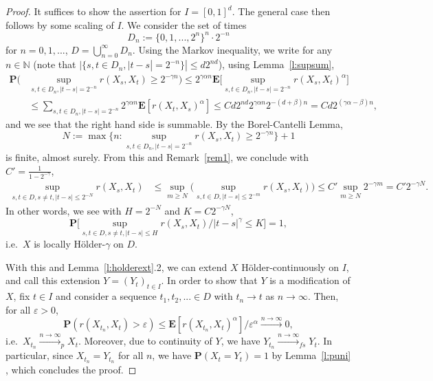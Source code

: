 \documentclass{article}
\theoremstyle{definition}
\theoremstyle{step} \newtheorem{step}{Step}
\begin{document}
\begin{proof}
  It suffices to show the assertion for $I=[0,1]^d$. The general case
  then follows by some scaling of $I$. We consider the set of times
  $$ D_n := \{0,1,...,2^n\}^n \cdot 2^{-n}$$ for $n=0,1,...$, $D
  =\bigcup_{n=0}^\infty D_n$. Using the Markov inequality, we write
  for any $n\in\mathbb N$ (note that $|\{s,t\in D_n, |t-s| = 2^{-n}\}|
  \leq d2^{nd}$), using Lemma~\ref{l:supsum},
  \begin{align*}
    \mathbf P\Big( & \sup_{s,t\in D_n, |t-s| = 2^{-n}} r(X_s, X_t)
    \geq 2^{-\gamma n} \Big) \leq 2^{\gamma \alpha n}\mathbf
    E\Big[\sup_{s,t\in D_n, |t-s| = 2^{-n}} r(X_s, X_t)^\alpha \Big]
    \\ & \leq \sum_{s,t\in D_n, |t-s| = 2^{-n}} 2^{\gamma\alpha
      n}\mathbf E[r(X_t,X_s)^\alpha] \leq Cd2^{nd} 2^{\gamma\alpha n}
    2^{-(d + \beta) n} = Cd 2^{(\gamma\alpha - \beta)n},
  \end{align*}
  and we see that the right hand side is summable. By the
  Borel-Cantelli Lemma,
  $$ N := \max \Big\{n: \sup_{s,t\in D_n, |t-s| = 2^{-n}} r(X_s, X_t)
  \geq 2^{-\gamma n}\Big\} + 1$$ is finite, almost surely. From this
  and Remark~\ref{rem1}, we conclude with $C' =
  \frac{1}{1-2^{-\gamma}}$,
  \begin{align*}
    \sup_{s,t\in D, s\neq t, |t-s| \leq 2^{-N}} r(X_s, X_t) & \leq
    \sup_{m \geq N} \Big( \sup_{s,t\in D, |t-s|\leq 2^{-m}} r(X_s,
    X_t)\Big) \leq C' \sup_{m \geq N} 2^{-\gamma m} = C' 2^{-\gamma
      N}.
  \end{align*}
  In other words, we see with $H = 2^{-N}$ and $K = C 2^{-\gamma N}$,
  $$ \mathbf P\Big[\sup_{s,t\in D, s\neq t, |t-s| \leq H} r(X_s,
    X_t)/|t-s|^\gamma \leq K\Big] = 1,
  $$
  i.e.\ $X$ is locally Hölder-$\gamma$ on $D$.

  With this and Lemma~\ref{l:holderext}.2, we can extend $X$
  Hölder-continuously on $I$, and call this extension $ Y =
  (Y_t)_{t\in I}$. In order to show that $Y$ is a modification of $X$,
  fix $t\in I$ and consider a sequence $t_1,t_2,...\in D$ with $t_n\to
  t$ as $n\to \infty$. Then, for all $\varepsilon>0$,
  $$\mathbf P(r(X_{t_n}, X_t) > \varepsilon) \leq \mathbf E[r(X_{t_n},
    X_t)^\alpha]/\varepsilon^\alpha \xrightarrow{n\to\infty} 0,$$
  i.e.\ $X_{t_n} \xrightarrow{n\to\infty}_p X_t$. Moreover, due to
  continuity of $Y$, we have $Y_{t_n} \xrightarrow{n\to\infty}_{fs}
  Y_t$. In particular, since $X_{t_n} = Y_{t_n}$ for all $n$, we have
  $\mathbf P(X_t= Y_t)=1$ by Lemma~\ref{l:puni} , which concludes the
  proof.
\end{proof}




\end{document}
